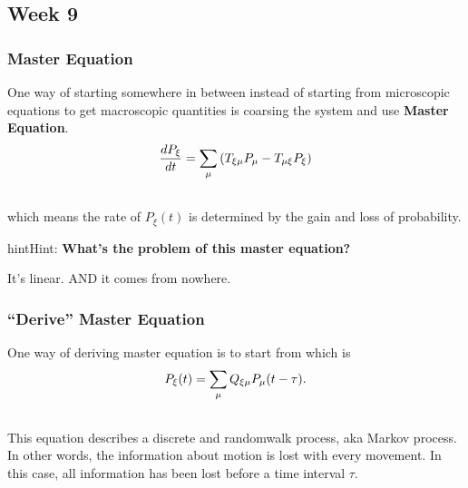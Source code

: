\documentclass[letterpaper,10pt,english]{sphinxmanual}
\begin{document}
\subsection{Week 9}
\label{nonequilibrium/week9:week-9}\label{nonequilibrium/week9::doc}

\subsubsection{Master Equation}
\label{nonequilibrium/week9:master-equation}\label{nonequilibrium/week9:index-0}
One way of starting somewhere in between instead of starting from microscopic equations to get macroscopic quantities is coarsing the system and use \textbf{Master Equation}.
\begin{gather}
\begin{split}\frac{dP_\xi}{d t} = \sum_{\mu} \left( T_{\xi\mu} P_\mu - T_{\mu\xi} P_\xi \right)\end{split}\notag\\\begin{split}\end{split}\notag
\end{gather}
which means the rate of $P_\xi(t)$ is determined by the gain and loss of probability.

\begin{notice}{hint}{Hint:}
\textbf{What's the problem of this master equation?}

It's linear. AND it comes from nowhere.
\end{notice}


\subsubsection{``Derive'' Master Equation}
\label{nonequilibrium/week9:index-1}\label{nonequilibrium/week9:derive-master-equation}
One way of deriving master equation is to start from  which is
\begin{gather}
\begin{split}P_\xi(t) = \sum_\mu Q_{\xi\mu} P_\mu(t-\tau) .\end{split}\notag\\\begin{split}\end{split}\notag
\end{gather}
This equation describes a discrete and randomwalk process, aka Markov process. In other words, the information about motion is lost with every movement. In this case, all information has been lost before a time interval $\tau$.
\end{document}
